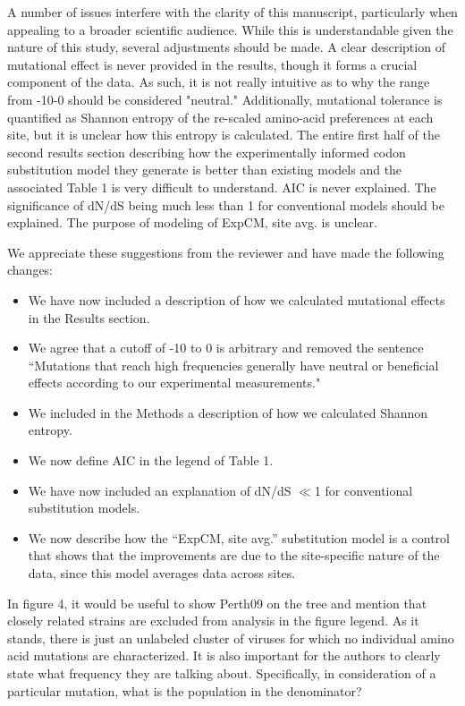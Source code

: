 \documentclass[11pt, oneside]{article}   	%
\newcommand{\response}[1]{{\color{black}#1}}
\begin{document}
A number of issues interfere with the clarity of this manuscript, particularly when appealing to a broader scientific audience. While this is understandable given the nature of this study, several adjustments should be made. A clear description of mutational effect is never provided in the results, though it forms a crucial component of the data. As such, it is not really intuitive as to why the range from -10-0 should be considered "neutral." Additionally, mutational tolerance is quantified as Shannon entropy of the re-scaled amino-acid preferences at each site, but it is unclear how this entropy is calculated. The entire first half of the second results section describing how the experimentally informed codon substitution model they generate is better than existing models and the associated Table 1 is very difficult to understand. AIC is never explained. The significance of dN/dS being much less than 1 for conventional models should be explained. The purpose of modeling of ExpCM, site avg. is unclear. 

\response{We appreciate these suggestions from the reviewer and have made the following changes:
\begin{itemize}
\item We have now included a description of how we calculated mutational effects in the Results section.
\item We agree that a cutoff of -10 to 0 is arbitrary and removed the sentence ``Mutations that reach high frequencies generally have neutral or beneficial effects according to our experimental measurements." 
\item We included in the Methods a description of how we calculated Shannon entropy.
\item We now define AIC in the legend of Table 1.
\item We have now included an explanation of dN/dS $\ll$1 for conventional substitution models.
\item We now describe how the ``ExpCM, site avg.'' substitution model is a control that shows that the improvements are due to the site-specific nature of the data, since this model averages data across sites.
\end{itemize}
}

In figure 4, it would be useful to show Perth09 on the tree and mention that closely related strains are excluded from analysis in the figure legend. As it stands, there is just an unlabeled cluster of viruses for which no individual amino acid mutations are characterized. It is also important for the authors to clearly state what frequency they are talking about. Specifically, in consideration of a particular mutation, what is the population in the denominator? 
\end{document}
